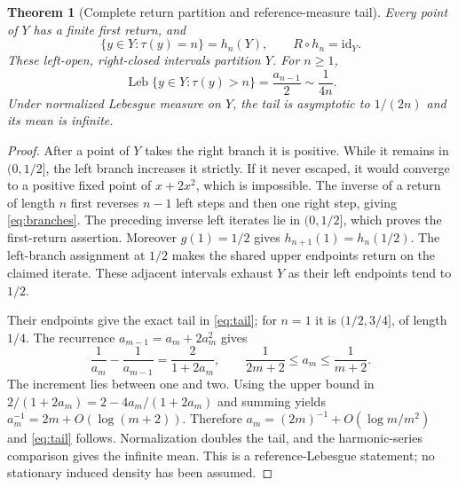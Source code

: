 \documentclass[10pt]{article}
\newcommand{\Leb}{\operatorname{Leb}}
\newtheorem{theorem}{Theorem}
\begin{document}
\begin{theorem}[Complete return partition and reference-measure tail]
Every point of $Y$ has a finite first return, and
\begin{equation}
\{y\in Y:\tau(y)=n\}=h_n(Y),\qquad R\circ h_n=\mathrm{id}_Y.
\label{eq:return}
\end{equation}
These left-open, right-closed intervals partition $Y$. For $n\ge1$,
\begin{equation}
\Leb\{y\in Y:\tau(y)>n\}=\frac{a_{n-1}}2\sim\frac1{4n}.
\label{eq:tail}
\end{equation}
Under normalized Lebesgue measure on $Y$, the tail is asymptotic to
$1/(2n)$ and its mean is infinite.
\end{theorem}
\begin{proof}
After a point of $Y$ takes the right branch it is positive. While it remains
in $(0,1/2]$, the left branch increases it strictly. If it never escaped,
it would converge to a positive fixed point of $x+2x^2$, which is impossible.
The inverse of a return of length $n$ first reverses $n-1$ left steps and
then one right step, giving \eqref{eq:branches}. The preceding inverse
left iterates lie in $(0,1/2]$, which proves the first-return assertion.
Moreover $g(1)=1/2$ gives $h_{n+1}(1)=h_n(1/2)$. The left-branch assignment
at $1/2$ makes the shared upper endpoints return on the claimed iterate.
These adjacent intervals exhaust $Y$ as their left endpoints tend to $1/2$.

Their endpoints give the exact tail in \eqref{eq:tail}; for $n=1$ it is
$(1/2,3/4]$, of length $1/4$. The recurrence
$a_{m-1}=a_m+2a_m^2$ gives
\begin{equation}
\frac1{a_m}-\frac1{a_{m-1}}=\frac2{1+2a_m},\qquad
\frac1{2m+2}\le a_m\le\frac1{m+2}.
\label{eq:reciprocal}
\end{equation}
The increment lies between one and two. Using the upper bound in
$2/(1+2a_m)=2-4a_m/(1+2a_m)$ and summing yields
$a_m^{-1}=2m+O(\log(m+2))$. Therefore
$a_m=(2m)^{-1}+O(\log m/m^2)$ and \eqref{eq:tail} follows.
Normalization doubles the tail, and the harmonic-series comparison gives
the infinite mean. This is a reference-Lebesgue statement; no stationary
induced density has been assumed.
\end{proof}
\end{document}

